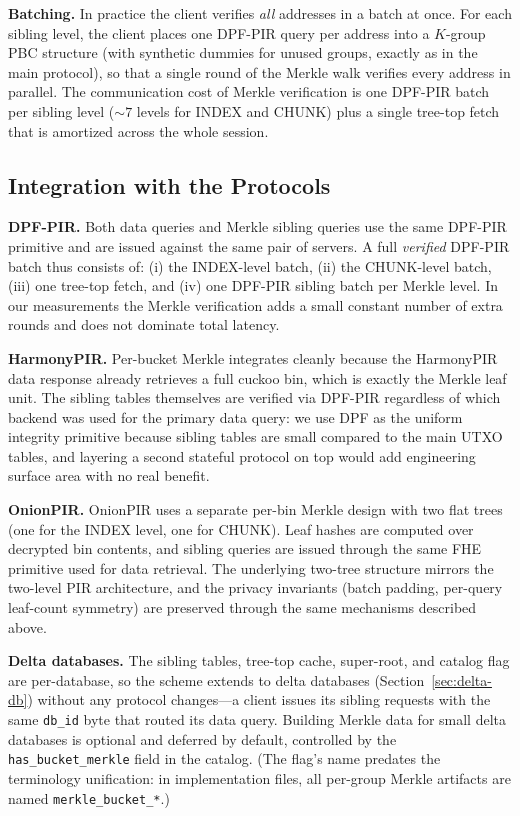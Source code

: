 \textbf{Batching.} In practice the client verifies \emph{all} addresses in a batch at once. For each sibling level, the client places one DPF-PIR query per address into a $K$-group PBC structure (with synthetic dummies for unused groups, exactly as in the main protocol), so that a single round of the Merkle walk verifies every address in parallel. The communication cost of Merkle verification is one DPF-PIR batch per sibling level ($\sim\!7$ levels for INDEX and CHUNK) plus a single tree-top fetch that is amortized across the whole session.

\subsection{Integration with the Protocols}

\textbf{DPF-PIR.} Both data queries and Merkle sibling queries use the same DPF-PIR primitive and are issued against the same pair of servers. A full \emph{verified} DPF-PIR batch thus consists of: (i) the INDEX-level batch, (ii) the CHUNK-level batch, (iii) one tree-top fetch, and (iv) one DPF-PIR sibling batch per Merkle level. In our measurements the Merkle verification adds a small constant number of extra rounds and does not dominate total latency.

\textbf{HarmonyPIR.} Per-bucket Merkle integrates cleanly because the HarmonyPIR data response already retrieves a full cuckoo bin, which is exactly the Merkle leaf unit. The sibling tables themselves are verified via DPF-PIR regardless of which backend was used for the primary data query: we use DPF as the uniform integrity primitive because sibling tables are small compared to the main UTXO tables, and layering a second stateful protocol on top would add engineering surface area with no real benefit.

\textbf{OnionPIR.} OnionPIR uses a separate per-bin Merkle design with two flat trees (one for the INDEX level, one for CHUNK). Leaf hashes are computed over decrypted bin contents, and sibling queries are issued through the same FHE primitive used for data retrieval. The underlying two-tree structure mirrors the two-level PIR architecture, and the privacy invariants (batch padding, per-query leaf-count symmetry) are preserved through the same mechanisms described above.

\textbf{Delta databases.} The sibling tables, tree-top cache, super-root, and catalog flag are per-database, so the scheme extends to delta databases (Section~\ref{sec:delta-db}) without any protocol changes---a client issues its sibling requests with the same \texttt{db\_id} byte that routed its data query. Building Merkle data for small delta databases is optional and deferred by default, controlled by the \texttt{has\_bucket\_merkle} field in the catalog. (The flag's name predates the terminology unification: in implementation files, all per-group Merkle artifacts are named \texttt{merkle\_bucket\_*}.)

